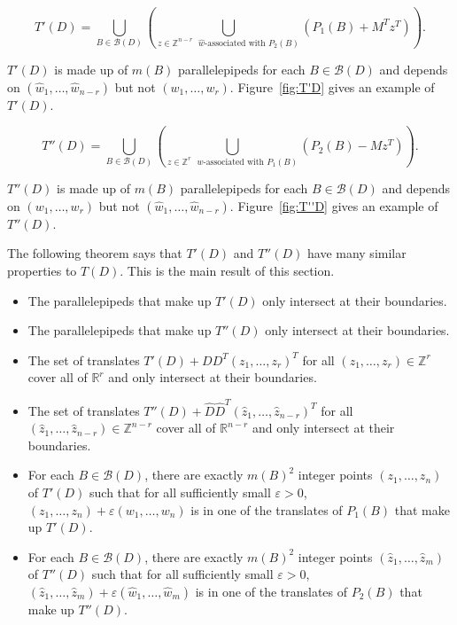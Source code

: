\documentclass[ALCO,ThmDefs,Unicode,epreuves]{cedram}
\renewcommand{\epsilon}{\varepsilon}
\newcommand{\R}{\mathbb{R}}
\newcommand{\Z}{\mathbb{Z}}
\newcommand{\B}{\mathcal{B}}
\begin{document}
\begin{defi}
\[
 T'(D) = \bigcup_{B \in \B(D)} \left(\bigcup_{z\in \Z^{n-r} \text{ $\widehat w$-associated with } P_2(B)} \left(P_1(B) + M^T z^T\right)\right).
\]
\end{defi}
 $T'(D)$ is made up of $m(B)$ parallelepipeds for each $B \in \B(D)$ and depends on $(\widehat w_1,\dots, \widehat w_{n-r})$ but not $(w_1,\dots, w_r)$. Figure~\ref{fig:T'D} gives an example of $T'(D)$.

\begin{defi}
\[
 T''(D) = \bigcup_{B \in \B(D)} \left(\bigcup_{ z\in \Z^r \text{ $w$-associated with } P_1(B)} \left(P_2(B) - M z^T\right)\right).
\]
\end{defi}

$T''(D)$ is made up of $m(B)$ parallelepipeds for each $B \in \B(D)$ and depends on $(w_1,\dots, w_r)$ but not $(\widehat w_1,\dots,\widehat w_{n-r})$. Figure~\ref{fig:T''D} gives an example of $T''(D)$.

The following theorem says that $T'(D)$ and $T''(D)$ have many similar properties to $T(D)$. This is the main result of this section.
\begin{theorem}

\begin{itemize}
 \item The parallelepipeds that make up $T'(D)$ only intersect at their boundaries. 
 \item The parallelepipeds that make up $T''(D)$ only intersect at their boundaries. 
 \item The set of translates $T'(D) + DD^T(z_1,\dots,z_r)^T$ for all $(z_1,\dots,z_r) \in \Z^r$ cover all of $\R^r$ and only intersect at their boundaries. 
 \item The set of translates $T''(D) + \widehat D\widehat D^T(\widehat z_1,\dots,\widehat z_{n-r})^T$ for all $(\widehat z_1,\dots,\widehat z_{n-r}) \in \Z^{n-r}$ cover all of $\R^{n-r}$ and only intersect at their boundaries. 
 \item For each $B\in \B(D)$, there are exactly $m(B)^2$ integer points $(z_1,\dots, z_n)$ of $T'(D)$ such that for all sufficiently small $\epsilon>0$, $(z_1,\dots, z_n) + \epsilon(w_1,\dots,w_n)$ is in one of the translates of $P_1(B)$ that make up $T'(D)$. 
 \item For each $B\in \B(D)$, there are exactly $m(B)^2$ integer points $(\widehat z_1,\dots, \widehat z_m)$ of $T''(D)$ such that for all sufficiently small $\epsilon>0$, $(\widehat z_1,\dots, \widehat z_m) + \epsilon(\widehat w_1,\dots,\widehat w_m)$ is in one of the translates of $P_2(B)$ that make up $T''(D)$. 
\end{itemize}
\end{theorem}
\end{document}
